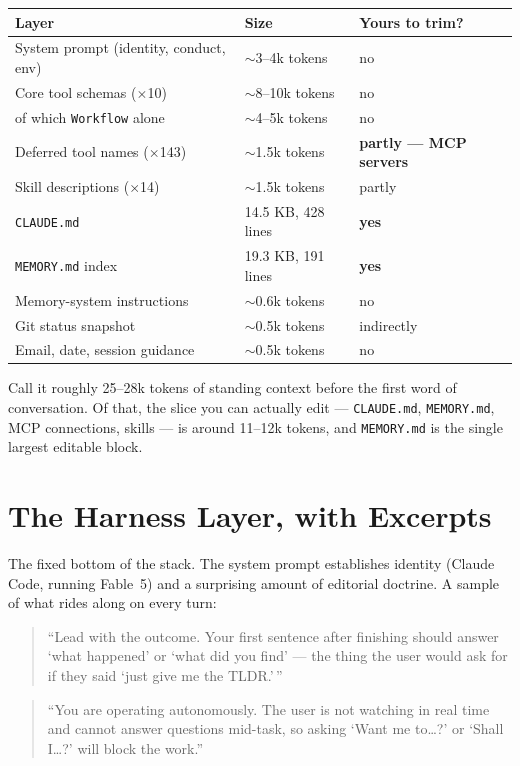\documentclass[11pt,letterpaper]{article}
\newenvironment{excerpt}{%
  \par\vspace{0.5em}%
  \begin{quote}\small\color{acdark}%
}{%
  \end{quote}\vspace{0.3em}\par%
}
\begin{document}
\begin{center}
\small
\begin{tabular}{lll}
\toprule
\textbf{Layer} & \textbf{Size} & \textbf{Yours to trim?} \\
\midrule
System prompt (identity, conduct, env) & $\sim$3--4k tokens & no \\
Core tool schemas ($\times$10) & $\sim$8--10k tokens & no \\
\quad of which \texttt{Workflow} alone & $\sim$4--5k tokens & no \\
Deferred tool names ($\times$143) & $\sim$1.5k tokens & \textbf{partly --- MCP servers} \\
Skill descriptions ($\times$14) & $\sim$1.5k tokens & partly \\
\texttt{CLAUDE.md} & 14.5 KB, 428 lines & \textbf{yes} \\
\texttt{MEMORY.md} index & 19.3 KB, 191 lines & \textbf{yes} \\
Memory-system instructions & $\sim$0.6k tokens & no \\
Git status snapshot & $\sim$0.5k tokens & indirectly \\
Email, date, session guidance & $\sim$0.5k tokens & no \\
\bottomrule
\end{tabular}
\end{center}

Call it roughly 25--28k tokens of standing context before the first word of conversation. Of that, the slice you can actually edit --- \texttt{CLAUDE.md}, \texttt{MEMORY.md}, MCP connections, skills --- is around 11--12k tokens, and \texttt{MEMORY.md} is the single largest editable block.

\section{The Harness Layer, with Excerpts}

The fixed bottom of the stack. The system prompt establishes identity (Claude Code, running Fable~5) and a surprising amount of editorial doctrine. A sample of what rides along on every turn:

\begin{excerpt}
``Lead with the outcome. Your first sentence after finishing should answer `what happened' or `what did you find' --- the thing the user would ask for if they said `just give me the TLDR.'\,''
\end{excerpt}

\begin{excerpt}
``You are operating autonomously. The user is not watching in real time and cannot answer questions mid-task, so asking `Want me to\ldots?' or `Shall I\ldots?' will block the work.''
\end{excerpt}
\end{document}
